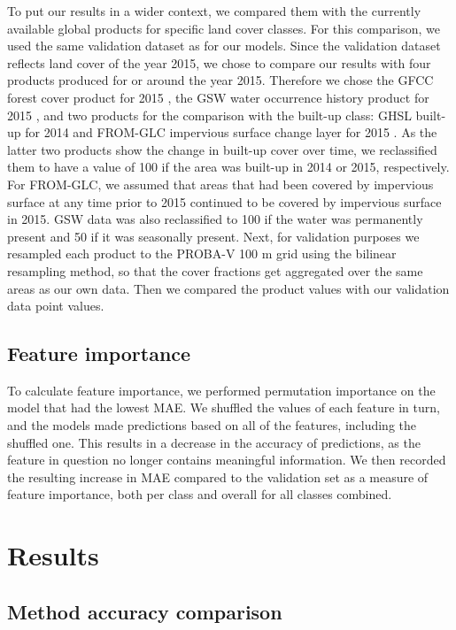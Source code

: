 \documentclass[review,authoryear,3p]{elsarticle}
\begin{document}
To put our results in a wider context, we compared them with the currently available global products for specific land cover classes.
For this comparison, we used the same validation dataset as for our models.
Since the validation dataset reflects land cover of the year 2015, we chose to compare our results with four products produced for or around the year 2015.
Therefore we chose the \gls{GFCC} forest cover product for 2015 \citep{townshend_global_2017}, the \gls{GSW} water occurrence history product for 2015 \citep{pekel_high-resolution_2016}, and two products for the comparison with the built-up class: \gls{GHSL} built-up for 2014 \citep{corbane_automated_2019} and \gls{FROM-GLC} impervious surface change layer for 2015 \citep{gong_annual_2020}.
As the latter two products show the change in built-up cover over time, we reclassified them to have a value of 100 if the area was built-up in 2014 or 2015, respectively.
For \gls{FROM-GLC}, we assumed that areas that had been covered by impervious surface at any time prior to 2015 continued to be covered by impervious surface in 2015.
\gls{GSW} data was also reclassified to 100 if the water was permanently present and 50 if it was seasonally present.
Next, for validation purposes we resampled each product to the PROBA-V 100 m grid using the bilinear resampling method, so that the cover fractions get aggregated over the same areas as our own data.
Then we compared the product values with our validation data point values.

\subsection{Feature importance}

To calculate feature importance, we performed permutation importance on the model that had the lowest \gls{MAE}.
We shuffled the values of each feature in turn, and the models made predictions based on all of the features, including the shuffled one.
This results in a decrease in the accuracy of predictions, as the feature in question no longer contains meaningful information.
We then recorded the resulting increase in \gls{MAE} compared to the validation set as a measure of feature importance, both per class and overall for all classes combined.

\section{Results}

\subsection{Method accuracy comparison}
\end{document}
